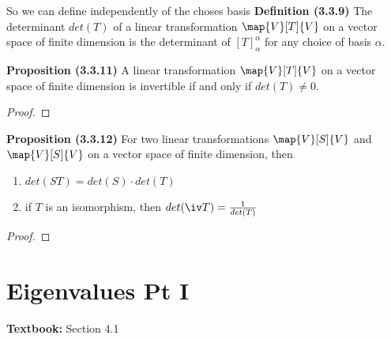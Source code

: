 \documentclass[letterpaper, 10pt]{article}
\begin{document}
\newpage
\lb
So we can define independently of the choses basis
\lb
\textbf{Definition (3.3.9)}
\lb
The determinant $det(T)$ of a linear transformation $\map{V}[T]{V}$ on a vector space of finite dimension
is the determinant of $[T]_α^α$ for any choice of basis $α$.







\vspace{200pt}
\lb
\textbf{Proposition (3.3.11)}
\lb
A linear transformation $\map{V}[T]{V}$ on a vector space of finite dimension is invertible
if and only if $det(T) \neq 0$.
\begin{proof}
\end{proof}




\vspace{200pt}
\lb
\textbf{Proposition (3.3.12)}
\lb
For two linear transformations $\map{V}[S]{V}$ and $\map{V}[S]{V}$ on a vector space of
finite dimension, then
\begin{enumerate}
    \item $ det(ST) = det(S) \cdot det(T)$
    \item if $T$ is an isomorphism, then $det(\iv T) = \frac{1}{det(T)}$
\end{enumerate}
\begin{proof}
\end{proof}






\newpage
\section*{Eigenvalues Pt I}%
\textbf{Textbook:} Section 4.1
\end{document}
